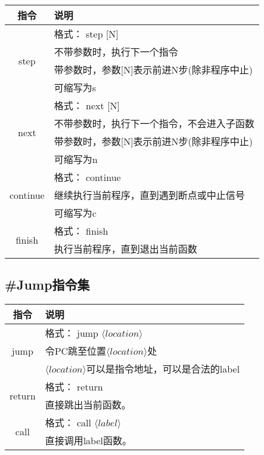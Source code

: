 \documentclass[12pt]{article} %
\begin{document}
\begin{sloppypar}
\begin{table}[h]
\begin{tabular}{|c|l|}
\hline
{\bf 指令} & {\bf 说明} \\ 
\hline
\multirow{4}{*}{step} & 格式： step [N] \\
 & 不带参数时，执行下一个指令 \\
 & 带参数时，参数[N]表示前进N步(除非程序中止) \\
 & 可缩写为s \\ 
\hline
\multirow{4}{*}{next} & 格式： next [N] \\
 & 不带参数时，执行下一个指令，不会进入子函数 \\
 & 带参数时，参数[N]表示前进N步(除非程序中止) \\
 & 可缩写为n \\ 
\hline
\multirow{3}{*}{continue} & 格式： continue \\
 & 继续执行当前程序，直到遇到断点或中止信号 \\
 & 可缩写为c \\
\hline
\multirow{2}{*}{finish} & 格式： finish \\
 & 执行当前程序，直到退出当前函数 \\
\hline
\end{tabular}
\end{table}

\subsection{\#Jump指令集}

\begin{table}[h]
\begin{tabular}{|c|l|}
\hline
{\bf 指令} & {\bf 说明} \\ 
\hline
\multirow{3}{*}{jump} & 格式： jump $\langle location\rangle$ \\
 & 令PC跳至位置$\langle location\rangle$处 \\
 & $\langle location\rangle$可以是指令地址，可以是合法的label \\
\hline
\multirow{2}{*}{return} & 格式： return \\
 & 直接跳出当前函数。 \\
\hline
\multirow{2}{*}{call} & 格式： call $\langle label\rangle$ \\
 &  直接调用label函数。 \\
\hline
\end{tabular}
\end{table}

\clearpage

\end{sloppypar}
\end{document}
